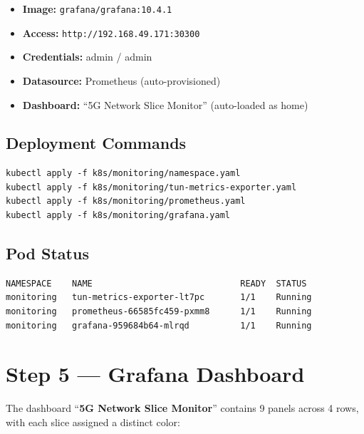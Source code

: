 \documentclass[12pt,a4paper]{article}
\begin{document}
\begin{itemize}
    \item \textbf{Image:} \texttt{grafana/grafana:10.4.1}
    \item \textbf{Access:} \texttt{http://192.168.49.171:30300}
    \item \textbf{Credentials:} admin / admin
    \item \textbf{Datasource:} Prometheus (auto-provisioned)
    \item \textbf{Dashboard:} ``5G Network Slice Monitor'' (auto-loaded as home)
\end{itemize}

\subsection{Deployment Commands}

\begin{lstlisting}[style=terminal]
kubectl apply -f k8s/monitoring/namespace.yaml
kubectl apply -f k8s/monitoring/tun-metrics-exporter.yaml
kubectl apply -f k8s/monitoring/prometheus.yaml
kubectl apply -f k8s/monitoring/grafana.yaml
\end{lstlisting}

\subsection{Pod Status}

\begin{lstlisting}[style=terminal]
NAMESPACE    NAME                             READY  STATUS
monitoring   tun-metrics-exporter-lt7pc       1/1    Running
monitoring   prometheus-66585fc459-pxmm8      1/1    Running
monitoring   grafana-959684b64-mlrqd          1/1    Running
\end{lstlisting}


\section{Step 5 — Grafana Dashboard}

The dashboard ``\textbf{5G Network Slice Monitor}'' contains 9 panels across 4 rows, with each slice assigned a distinct color:
\end{document}
